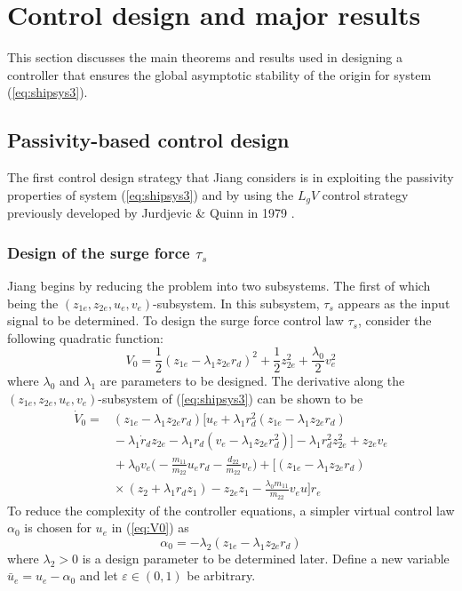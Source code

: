 \documentclass[amsthm, twocolumn]{autart}
\begin{document}
\section{Control design and major results}

This section discusses the main theorems and results used in designing a controller that ensures the global asymptotic stability of the origin for system (\ref{eq:shipsys3}). 

\subsection{Passivity-based control design}
\label{sect_passivity}
The first control design strategy that Jiang considers is in exploiting the passivity properties of system (\ref{eq:shipsys3}) and by using the $L_gV$ control strategy previously developed by Jurdjevic \& Quinn in 1979 \cite{JuQu79}. 
%
%
\subsubsection{Design of the surge force $\tau_s$}
\label{sect_passivity_tau_s}
Jiang begins by reducing the problem into two subsystems. The first of which being the $(z_{1e},z_{2e},u_e,v_e)$-subsystem. In this subsystem, $\tau_s$ appears as the input signal to be determined. To design the surge force control law $\tau_s$, consider the following quadratic function:
%
%
\begin{equation}
V_0=\frac{1}{2}(z_{1e} - \lambda_1 z_{2e} r_d)^2 + \frac{1}{2} z_{2e}^2 + \frac{\lambda_0}{2} v_e^2
\end{equation}
%
%
where $\lambda_0$ and $\lambda_1$ are parameters to be designed. The derivative along the $(z_{1e},z_{2e},u_e,v_e)$-subsystem of (\ref{eq:shipsys3}) can be shown to be 
%
%
\begin{equation}
\begin{split}
\dot{V}_0= & (z_{1e} - \lambda_1z_{2e} r_d)[u_e + \lambda_1 r_d^2 (z_{1e} - \lambda_1z_{2e} r_d)  \\
&\!\! - \lambda_1\dot{r}_d z_{2e}  -\lambda_1 r_d (v_e - \lambda_1z_{2e} r_d^2)] - \lambda_1r_d^2 z_{2e}^2 + z_{2e}v_e \\
&\!\! + \lambda_0v_e\bigg(-\frac{m_{11}}{m_{22}}u_e r_d-\frac{d_{22}}{m_{22}} v_e\bigg) + \bigg[ (z_{1e} - \lambda_1 z_{2e} r_d) \\
&\!\! \times (z_2+\lambda_1r_d z_1)-z_{2e} z_1 - \frac{\lambda_0m_{11}}{m_{22}} v_eu \bigg]r_e
\end{split}
\label{eq:V0}
\end{equation}
%
%
To reduce the complexity of the controller equations, a simpler virtual control law $\alpha_0$ is chosen for $u_e$ in (\ref{eq:V0}) as
%
%
\begin{equation}
\alpha_0 = -\lambda_2 (z_{1e} - \lambda_1 z_{2e} r_d)
\end{equation}
%
%
where  $\lambda_2>0$ is a design parameter to be determined later. Define a new variable $\bar{u}_e=u_e-\alpha_0$ and let $\varepsilon \in (0,1)$ be arbitrary.
\end{document}
